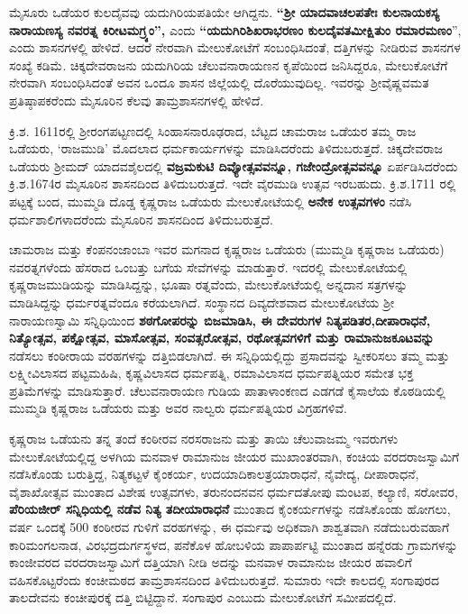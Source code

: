 ಮೈಸೂರು ಒಡೆಯರ ಕುಲದೈವವು ಯದುಗಿರಿಯಪತಿಯೇ ಆಗಿದ್ದನು. \textbf{“ಶ‍್ರೀ ಯಾದವಾಚಲಪತೇಃ ಕುಲನಾಯಕಸ್ಯ ನಾರಾಯಣಸ್ಯ ನವರತ್ನ ಕಿರೀಟಮಗ್ರ್ಯಂ”,} ಎಂದು \textbf{“ಯದುಗಿರಿಶಿಖರಾಭರಣಂ ಕುಲದೈವತಮೀಕ್ಷಿತುಂ ರಮಾರಮಣಂ}”, ಎಂದು ಶಾಸನಗಳಲ್ಲಿ ಹೇಳಿದೆ. ಆದರೆ ನೇರವಾಗಿ ಮೇಲುಕೋಟೆಗೆ ಸಂಬಂಧಿಸಿದಂತೆ, ದತ್ತಿಗಳನ್ನು ನೀಡಿರುವ ಶಾಸನಗಳ ಸಂಖ್ಯೆ ಕಡಿಮೆ. ಚಿಕ್ಕದೇವರಾಜನು ಯದುಗಿರಿಯ ಚೆಲುವನಾರಾಯಣನ ಕೃಪೆಯಿಂದ ಜನಿಸಿದ್ದರೂ, ಮೇಲುಕೋಟೆಗೆ ನೇರವಾಗಿ ಸಂಬಂಧಿಸಿದಂತೆ ಅವನ ಒಂದೂ ಶಾಸನ ಜಿಲ್ಲೆಯಲ್ಲಿ ದೊರೆಯುವುದಿಲ್ಲ. ಇವರನ್ನು ಶ‍್ರೀವೈಷ್ಣವಮತ ಪ್ರತಿಷ್ಠಾಪಕರೆಂದು ಮೈಸೂರಿನ ಕೆಲವು ತಾಮ್ರಶಾಸನಗಳಲ್ಲಿ ಹೇಳಿದೆ.

ಕ್ರಿ.ಶ. 1611ರಲ್ಲಿ ಶ‍್ರೀರಂಗಪಟ್ಟಣದಲ್ಲಿ ಸಿಂಹಾಸನಾರೂಢರಾದ, ಬೆಟ್ಟದ ಚಾಮರಾಜ ಒಡೆಯರ ತಮ್ಮ ರಾಜ ಒಡೆಯರು, ‘ರಾಜಮುಡಿ’ ಮೊದಲಾದ ಧರ್ಮಕಾರ್ಯಗಳನ್ನು ಮಾಡಿಸಿದರೆಂದು ತಿಳಿದುಬರುತ್ತದೆ. ಚಿಕ್ಕದೇವರಾಜ ಒಡೆಯರು ಶ‍್ರೀಮದ್​ ಯಾದವಶೈಲದಲ್ಲಿ \textbf{ವಜ್ರಮಕುಟಿ ದಿವ್ಯೋತ್ಸವವನ್ನೂ, ಗಜೇಂದ್ರೋತ್ಸವವನ್ನೂ} ಏರ್ಪಡಿಸಿದರೆಂದು ಕ್ರಿ.ಶ.1674ರ ಮೈಸೂರಿನ ಶಾಸನದಿಂದ ತಿಳಿದುಬರುತ್ತದೆ. ಇದೇ ವೈರಮುಡಿ ಉತ್ಸವ ಇರಬಹುದು. ಕ್ರಿ.ಶ.1711 ರಲ್ಲಿ ಪಟ್ಟಕ್ಕೆ ಬಂದ, ಮುಮ್ಮಡಿ ದೊಡ್ಡ ಕೃಷ್ಣರಾಜ ಒಡೆಯರು ಮೇಲುಕೋಟೆಯಲ್ಲಿ \textbf{ಅನೇಕ ಉತ್ಸವಗಳಂ} ನಡೆಸಿ ಧರ್ಮಶಾಲಿಗಳಾದರೆಂದು ಮೈಸೂರಿನ ಶಾಸನದಿಂದ ತಿಳಿದುಬರುತ್ತದೆ.

ಚಾಮರಾಜ ಮತ್ತು ಕೆಂಪನಂಜಾಂಬಾ ಇವರ ಮಗನಾದ ಕೃಷ್ಣರಾಜ ಒಡೆಯರು (ಮುಮ್ಮಡಿ ಕೃಷ್ಣರಾಜ ಒಡೆಯರು) ನವರತ್ನಗಳೆಂದು ಹೆಸರಾದ ಒಂಬತ್ತು ಬಗೆಯ ಸೇವೆಗಳನ್ನು ಮಾಡುತ್ತಾರೆ. ಇದರಲ್ಲಿ ಮೇಲುಕೋಟೆಯಲ್ಲಿ ಕೃಷ್ಣರಾಜಮುಡಿಯನ್ನು ಮಾಡಿಸಿದ್ದನ್ನು, ಭೂಷಾ ರತ್ನವೆಂದು, ಮೇಲುಕೋಟೆಯಲ್ಲಿ ಅನ್ನದಾನ ಸತ್ರಗಳನ್ನು ಮಾಡಿಸಿದ್ದನ್ನು ಧರ್ಮರತ್ನವೆಂದೂ ಕರೆಯಲಾಗಿದೆ. ಸಂಸ್ಥಾನದ ದಿವ್ಯದೇಶವಾದ ಮೇಲುಕೋಟೆಯ ಶ‍್ರೀ ನಾರಾಯಣಸ್ವಾಮಿ ಸನ್ನಿಧಿಯಿಂದ \textbf{ಶಠಗೋಪರನ್ನು ಬಿಜಮಾಡಿಸಿ, ಈ ದೇವರುಗಳ ನಿತ್ಯಪಡಿತರ,ದೀಪಾರಾಧನೆ, ನಿತ್ಯೋತ್ಸವ, ಪಕ್ಷೋತ್ಸವ, ಮಾಸೋತ್ಸವ, ಸಂವತ್ಸರೋತ್ಸವ, ರಥೋತ್ಸವಗಳಿಗೆ ಮತ್ತು ರಾಮಾನುಜಕೂಟವನ್ನು} ನಡೆಸಲು ಕಂಠೀರಾಯ ವರಹಗಳನ್ನು ದತ್ತಿಬಿಡಲಾಗಿದೆ. ಈ ಸನ್ನಿಧಿಯಲ್ಲಿದ್ದು ಪ್ರಸಾದವನ್ನು ಸ್ವೀಕರಿಸಲು ತಮ್ಮ ಮತ್ತು ಲಕ್ಷ್ಮೀವಿಲಾಸದ ಪಟ್ಟಮಹಿಷಿ, ಕೃಷ್ಣವಿಲಾಸದ ಧರ್ಮಪತ್ನಿ, ರಮಾವಿಲಾಸದ ಧರ್ಮಪತ್ನಿಯರ ಸಮೇತ ಭಕ್ತ ಪ್ರತಿಮೆಗಳನ್ನು ಮಾಡಿಸುತ್ತಾರೆ. ಚೆಲುವನಾರಾಯಣ ಗುಡಿಯ ಪಾತಾಳಾಂಕಣದ ಎಡಗಡೆ ಕೈಸಾಲೆಯ ಕೊಠಡಿಯಲ್ಲಿ ಮುಮ್ಮಡಿ ಕೃಷ್ಣರಾಜ ಒಡೆಯರು ಮತ್ತು ಅವರ ನಾಲ್ವರು ಧರ್ಮಪತ್ನಿಯರ ವಿಗ್ರಹಗಳಿವೆ.

ಕೃಷ್ಣರಾಜ ಒಡೆಯನು ತನ್ನ ತಂದೆ ಕಂಠೀರವ ನರಸರಾಜನು ಮತ್ತು ತಾಯಿ ಚೆಲುವಾಜಮ್ಮ ಇವರುಗಳು ಮೇಲುಕೋಟೆಯಲ್ಲಿದ್ದ ಅಳಗಿಯ ಮನವಾಳ ರಾಮಾನುಜ ಜೀಯರ ಮುಖಾಂತರವಾಗಿ, ಕಂಚಿಯ ವರದರಾಜಸ್ವಾಮಿಗೆ ನಡೆಸಿಕೊಂಡು ಬರುತ್ತಿದ್ದ, ನಿತ್ಯಕಟ್ಟಳೆ ಕೈಂಕರ್ಯ, ಉದಯಾದಿಕಾಲತ್ರಯಾರಾಧನೆ, ನೈವೇದ್ಯ, ದೀಪಾರಾಧನೆ, ವೈಶಾಖೋತ್ಸವ ಮುಂತಾದ ವಿಶೇಷ ಉತ್ಸವಗಳು, ತರುನಂದನವನ ಧರ್ಮದತೋಪು ಮಂಟಪ, ಕಲ್ಯಾಣಿ, ಸರೋವರ, \textbf{ಪೆರಿಯಜೀರ್​ ಸನ್ನಿಧಿಯಲ್ಲಿ ನಡೆವ ನಿತ್ಯ ತದೀಯಾರಾಧನೆ }ಮುಂತಾದ ಕೈಂಕರ್ಯಗಳನ್ನು ನಡೆಸಿಕೊಂಡು ಹೋಗಲು, ವರ್ಷ ಒಂದಕ್ಕೆ 500 ಕಂಠೀರವ ಗುಳಿಗೆ ವರಹಗಳನ್ನು, ಈ ಧರ್ಮವು ಅಧಿಕವಾಗಿ ಶಾಶ್ವತವಾಗಿ ನಡೆದುಬರುವಹಾಗೆ ಕಾರಿಮಂಗಲನಾಡ, ವಿರಭದ್ರದುರ್ಗಸ್ಥಳದ, ಪನೆಕೊಳ ಹೋಬಳಿಯ ಪಾಪಾರ್ಪಟ್ಟಿ ಮುಂತಾದ ಹನ್ನೆರಡು ಗ್ರಾಮಗಳನ್ನು ಕಾಂಜೀವರದ ವರದರಾಜಸ್ವಾಮಿಗೆ ದತ್ತಿಯಾಗಿ ನೀಡಿ ಅದನ್ನು ಮನವಾಳ ರಾಮಾನುಜ ಜೀಯರ ಹವಾಲಿಗೆ ವಹಿಸಕೊಟ್ಟರೆಂದು ಕಂಚೀಮಠದ ತಾಮ್ರಶಾಸನದಿಂದ ತಿಳಿದುಬರುತ್ತದೆ. ಸುಮಾರು ಇದೇ ಕಾಲದಲ್ಲಿ ಸಂಗಾಪುರದ ತಾಲದೇವನು ಕಂಚೀಪುರಕ್ಕೆ ದತ್ತಿ ಬಿಟ್ಟಿದ್ದಾನೆ. ಸಂಗಾಪುರ ಎಂಬುದು ಮೇಲುಕೋಟೆಗೆ ಸಮೀಪದಲ್ಲಿದೆ.


